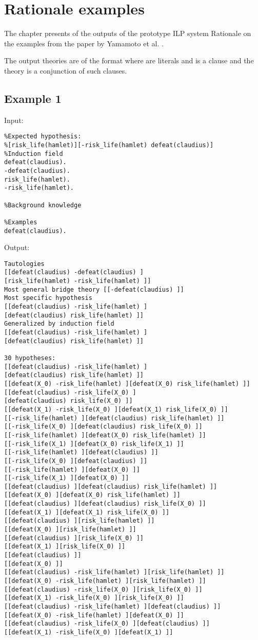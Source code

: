 \chapter{Rationale examples}
The chapter presents of the outputs of the prototype ILP system Rationale on the examples from the paper by Yamamoto et al. \cite{yamamoto2012inverse}.

The output theories are of the format \tc{[[L11...L1n]...[Lm1...L1k]]}
where  are literals and \tc{[L11...L1n]} is a clause and the theory is a conjunction of such clauses.

\section{Example 1}
Input:
\begin{lstlisting}
%Expected hypothesis:
%[risk_life(hamlet)][-risk_life(hamlet) defeat(claudius)]
%Induction field
defeat(claudius).
-defeat(claudius).
risk_life(hamlet).
-risk_life(hamlet).

%Background knowledge

%Examples
defeat(claudius).
\end{lstlisting}

Output:
\begin{lstlisting}
Tautologies
[[defeat(claudius) -defeat(claudius) ]
[risk_life(hamlet) -risk_life(hamlet) ]]
Most general bridge theory [[-defeat(claudius) ]]
Most specific hypothesis
[[defeat(claudius) -risk_life(hamlet) ]
[defeat(claudius) risk_life(hamlet) ]]
Generalized by induction field
[[defeat(claudius) -risk_life(hamlet) ]
[defeat(claudius) risk_life(hamlet) ]]

30 hypotheses:
[[defeat(claudius) -risk_life(hamlet) ]
[defeat(claudius) risk_life(hamlet) ]]
[[defeat(X_0) -risk_life(hamlet) ][defeat(X_0) risk_life(hamlet) ]]
[[defeat(claudius) -risk_life(X_0) ]
[defeat(claudius) risk_life(X_0) ]]
[[defeat(X_1) -risk_life(X_0) ][defeat(X_1) risk_life(X_0) ]]
[[-risk_life(hamlet) ][defeat(claudius) risk_life(hamlet) ]]
[[-risk_life(X_0) ][defeat(claudius) risk_life(X_0) ]]
[[-risk_life(hamlet) ][defeat(X_0) risk_life(hamlet) ]]
[[-risk_life(X_1) ][defeat(X_0) risk_life(X_1) ]]
[[-risk_life(hamlet) ][defeat(claudius) ]]
[[-risk_life(X_0) ][defeat(claudius) ]]
[[-risk_life(hamlet) ][defeat(X_0) ]]
[[-risk_life(X_1) ][defeat(X_0) ]]
[[defeat(claudius) ][defeat(claudius) risk_life(hamlet) ]]
[[defeat(X_0) ][defeat(X_0) risk_life(hamlet) ]]
[[defeat(claudius) ][defeat(claudius) risk_life(X_0) ]]
[[defeat(X_1) ][defeat(X_1) risk_life(X_0) ]]
[[defeat(claudius) ][risk_life(hamlet) ]]
[[defeat(X_0) ][risk_life(hamlet) ]]
[[defeat(claudius) ][risk_life(X_0) ]]
[[defeat(X_1) ][risk_life(X_0) ]]
[[defeat(claudius) ]]
[[defeat(X_0) ]]
[[defeat(claudius) -risk_life(hamlet) ][risk_life(hamlet) ]]
[[defeat(X_0) -risk_life(hamlet) ][risk_life(hamlet) ]]
[[defeat(claudius) -risk_life(X_0) ][risk_life(X_0) ]]
[[defeat(X_1) -risk_life(X_0) ][risk_life(X_0) ]]
[[defeat(claudius) -risk_life(hamlet) ][defeat(claudius) ]]
[[defeat(X_0) -risk_life(hamlet) ][defeat(X_0) ]]
[[defeat(claudius) -risk_life(X_0) ][defeat(claudius) ]]
[[defeat(X_1) -risk_life(X_0) ][defeat(X_1) ]]
\end{lstlisting}

